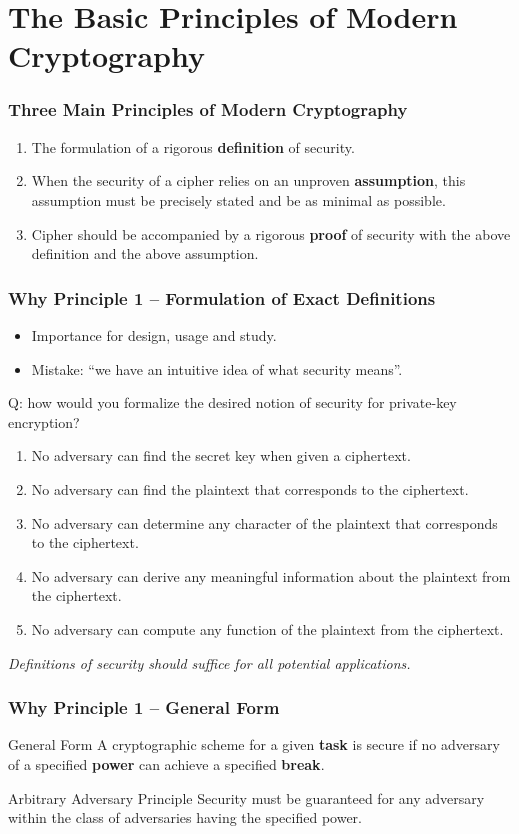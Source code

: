 \section{The Basic Principles of Modern Cryptography}
\begin{frame}\frametitle{Three Main Principles of Modern Cryptography}
\begin{enumerate}
\item The formulation of a rigorous \textbf{definition} of security.
\item When the security of a cipher relies on an unproven \textbf{assumption}, this assumption must be precisely stated and be as minimal as possible.
\item Cipher should be accompanied by a rigorous \textbf{proof} of security with the above definition and the above assumption.
\end{enumerate}
\end{frame}
\begin{frame}\frametitle{Why Principle 1 -- Formulation of Exact Definitions}
\begin{itemize}	
\item Importance for design, usage and study.
\item \alert{Mistake}: ``we have an intuitive idea of what security means''.
\end{itemize}
\begin{exampleblock}{Q: how would you formalize the desired notion of security for private-key encryption?}
\begin{enumerate}
\item No adversary can find the secret key when given a ciphertext.
\item No adversary can find the plaintext that corresponds to the ciphertext.
\item No adversary can determine any character of the plaintext that corresponds to the ciphertext.
\item No adversary can derive any meaningful information about the plaintext from the ciphertext.
\item No adversary can compute any function of the plaintext from the ciphertext.
\end{enumerate}
\emph{\alert{Definitions of security should suffice for all potential applications.}}
\end{exampleblock}
\end{frame}
\begin{frame}\frametitle{Why Principle 1 -- General Form}
\begin{exampleblock}{General Form}
A cryptographic scheme for a given \textbf{task} is secure if no adversary of a specified \textbf{power} can achieve a specified \textbf{break}.
\end{exampleblock}
\begin{alertblock}{Arbitrary Adversary Principle}
Security must be guaranteed for any adversary within the class of adversaries having the specified power.
\end{alertblock}
\end{frame}	
